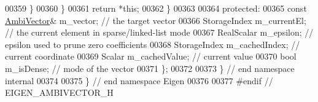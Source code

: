 \begin{DoxyCode}
00359         \}
00360       \}
00361       \textcolor{keywordflow}{return} *\textcolor{keyword}{this};
00362     \}
00363 
00364   \textcolor{keyword}{protected}:
00365     \textcolor{keyword}{const} \hyperlink{class_eigen_1_1internal_1_1_ambi_vector}{AmbiVector}& m\_vector; \textcolor{comment}{// the target vector}
00366     StorageIndex m\_currentEl;   \textcolor{comment}{// the current element in sparse/linked-list mode}
00367     RealScalar m\_epsilon;       \textcolor{comment}{// epsilon used to prune zero coefficients}
00368     StorageIndex m\_cachedIndex; \textcolor{comment}{// current coordinate}
00369     Scalar m\_cachedValue;       \textcolor{comment}{// current value}
00370     \textcolor{keywordtype}{bool} m\_isDense;             \textcolor{comment}{// mode of the vector}
00371 \};
00372 
00373 \} \textcolor{comment}{// end namespace internal}
00374 
00375 \} \textcolor{comment}{// end namespace Eigen}
00376 
00377 \textcolor{preprocessor}{#endif // EIGEN\_AMBIVECTOR\_H}
\end{DoxyCode}
